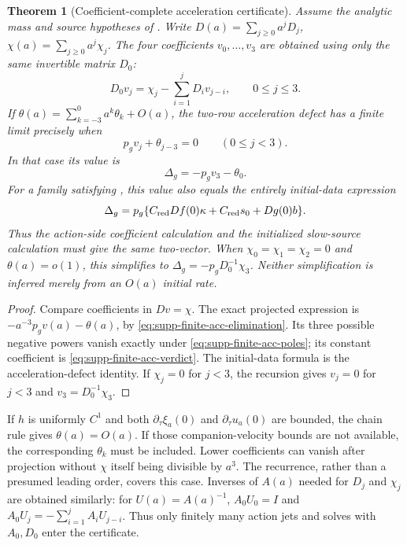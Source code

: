 \documentclass[11pt]{article}
\newtheorem{theorem}{Theorem}[section]
\numberwithin{equation}{section}
\theoremstyle{definition}
\theoremstyle{remark}
\begin{document}
\begin{theorem}[Coefficient-complete acceleration certificate]
\label{thm:supp-finite-acc-coefficients}
Assume the analytic mass and source hypotheses of
.  Write
$D(a)=\sum_{j\ge0}a^jD_j$, $\chi(a)=\sum_{j\ge0}a^j\chi_j$.
The four coefficients $v_0,\ldots,v_3$ are obtained using only the same
invertible matrix $D_0$:
\begin{equation}
 D_0v_j=\chi_j-\sum_{i=1}^jD_i v_{j-i},\qquad 0\le j\le3.
 \label{eq:supp-finite-acc-recursion}
\end{equation}
If $\theta(a)=\sum_{k=-3}^0 a^k\theta_k+O(a)$, the two-row acceleration
defect has a finite limit precisely when
\begin{equation}
 p_gv_j+\theta_{j-3}=0\qquad(0\le j<3).
 \label{eq:supp-finite-acc-poles}
\end{equation}
In that case its value is
\begin{equation}
 \Delta_g=-p_gv_3-\theta_0.
 \label{eq:supp-finite-acc-verdict}
\end{equation}
For a family satisfying , this value
also equals the entirely initial-data expression
\begin{equation}
 \Delta_g=p_g\{C_{\rm red}Df(0)\kappa+
                  C_{\rm red}s_0+Dg(0)b\}.
 \label{eq:supp-finite-acc-initial-verdict}
\end{equation}
Thus the action-side coefficient calculation and the initialized slow-source
calculation must give the same two-vector.  When
$\chi_0=\chi_1=\chi_2=0$ and $\theta(a)=o(1)$, this simplifies to
$\Delta_g=-p_gD_0^{-1}\chi_3$.  Neither simplification is inferred merely
from an $O(a)$ initial rate.
\end{theorem}
\begin{proof}
Compare coefficients in $Dv=\chi$.  The exact projected expression is
$-a^{-3}p_gv(a)-\theta(a)$, by
\eqref{eq:supp-finite-acc-elimination}.  Its three possible negative powers
vanish exactly under \eqref{eq:supp-finite-acc-poles}; its constant
coefficient is \eqref{eq:supp-finite-acc-verdict}.  The initial-data formula
is the acceleration-defect identity.  If $\chi_j=0$ for $j<3$, the
recursion gives $v_j=0$ for $j<3$ and $v_3=D_0^{-1}\chi_3$.
\end{proof}

If $h$ is uniformly $C^1$ and both $\partial_\tau\xi_a(0)$ and
$\partial_\tau u_a(0)$ are bounded, the chain rule gives $\theta(a)=O(a)$.
If those companion-velocity bounds are not available, the corresponding
$\theta_k$ must be included.  Lower coefficients can vanish after projection
without $\chi$ itself being divisible by $a^3$.  The recurrence, rather than
a presumed leading order, covers this case.  Inverses of $A(a)$ needed for
$D_j$ and $\chi_j$ are obtained similarly: for $U(a)=A(a)^{-1}$,
$A_0U_0=I$ and
$A_0U_j=-\sum_{i=1}^jA_iU_{j-i}$.  Thus only finitely many action jets and
solves with $A_0,D_0$ enter the certificate.
\end{document}
